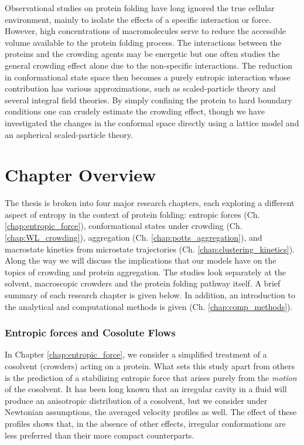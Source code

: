 Observational studies on protein folding have long ignored the true cellular environment, mainly to isolate the effects of a specific interaction or force. However, high concentrations of macromolecules serve to reduce the accessible volume available to the protein folding process. The interactions between the proteins and the crowding agents may be energetic but one often studies the general crowding effect alone due to the non-specific interactions. The  reduction in conformational state space then becomes a purely entropic interaction whose contribution has various approximations, such as scaled-particle theory and several integral field theories. By simply confining the protein to hard boundary conditions one can crudely estimate the crowding effect,\cite{mittal_thermodynamics_2008, wang_confinement_2009, zhou_stabilization_2001} though we have investigated the changes in the conformal space directly using a lattice model and an aspherical scaled-particle theory.\cite{hoppe_protein_2011}

\section{Chapter Overview}

The thesis is broken into four major research chapters, each exploring a different aspect of entropy in the context of protein folding: entropic forces (Ch. \ref{chap:entropic_force}), conformational states under crowding (Ch. \ref{chap:WL_crowding}), aggregation (Ch. \ref{chap:potts_aggregation}), and macrostate kinetics from microstate trajectories (Ch. \ref{chap:clustering_kinetics}). Along the way we will discuss the implications that our models have on the topics of crowding and protein aggregation. The studies look separately at the solvent, macroscopic crowders and the protein folding pathway itself. A brief summary of each research chapter is given below. In addition, an introduction to the analytical and computational methods is given (Ch. \ref{chap:comp_methods}).

\subsubsection{Entropic forces and Cosolute Flows}
In Chapter \ref{chap:entropic_force}, we consider a simplified treatment of a cosolvent (crowders) acting on a protein. What sets this study apart from others is the prediction of a stabilizing entropic force that arises purely from the \textit{motion} of the cosolvent. It has been long known that an irregular cavity in a fluid will produce an anisotropic distribution of a cosolvent, but we consider under Newtonian assumptions, the averaged velocity profiles as well. The effect of these profiles shows that, in the absence of other effects, irregular conformations are less preferred than their more compact counterparts.

